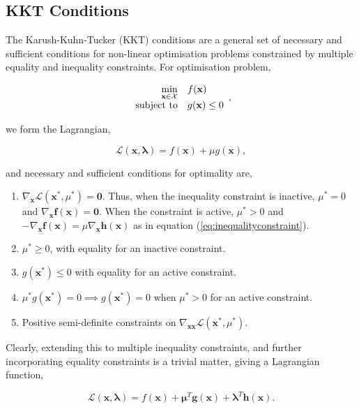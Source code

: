 \documentclass[11pt]{amsart}
\begin{document}
\subsection{KKT Conditions}

The Karush-Kuhn-Tucker (KKT) conditions are a general set of necessary and sufficient conditions for non-linear optimisation problems constrained by multiple equality and inequality constraints. For optimisation problem,

\begin{align}
\begin{array}{rl}
\displaystyle \min_{\mathbf{x} \in \mathcal{X}} & f(\mathbf{x})\\
\text{subject to} & g(\mathbf{x}) \leq 0
\end{array} \notag,
\end{align}

we form the Lagrangian,

$$\mathcal{L}(\mathbf{x}, \boldsymbol\lambda) = f(\mathbf{x}) + \mu g(\mathbf{x}),$$

and necessary and sufficient conditions for optimality are,

\begin{enumerate}
\item $\nabla_{\mathbf{x}}\mathcal{L}(\mathbf{x}^*, \mu^*) = \mathbf{0}$. Thus, when the inequality constraint is inactive, $\mu^{*} = 0$ and $\nabla_{\mathbf{x}}\mathbf{f}(\mathbf{x}) = \mathbf{0}$. When the constraint is active, $\mu^* > 0$ and $-\nabla_{\mathbf{x}}\mathbf{f}(\mathbf{x}) = \mu\nabla_{\mathbf{x}}\mathbf{h}(\mathbf{x})$ as in equation (\ref{eq:inequalityconstraint}).
\item $\mu^* \geq 0$, with equality for an inactive constraint.
\item $g(\mathbf{x}^*) \leq 0$ with equality for an active constraint.
\item $\mu^*g(\mathbf{x}^*) = 0 \implies g(\mathbf{x}^*) = 0$ when $\mu^* > 0$ for an active constraint.
\item Positive semi-definite constraints on $\nabla_{\mathbf{x}\mathbf{x}}\mathcal{L}(\mathbf{x}^*, \mu^*)$.
\end{enumerate}

Clearly, extending this to multiple inequality constraints, and further incorporating equality constraints is a trivial matter, giving a Lagrangian function,

$$\mathcal{L}(\mathbf{x}, \boldsymbol\lambda) = f(\mathbf{x}) + \boldsymbol\mu^T \mathbf{g}(\mathbf{x}) + \boldsymbol\lambda^T \mathbf{h}(\mathbf{x}).$$
\end{document}
